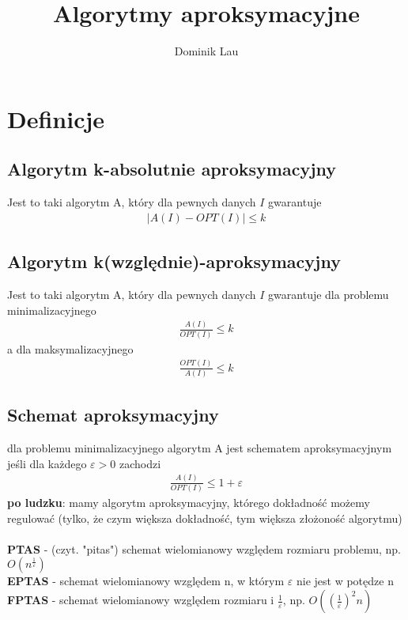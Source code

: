 \documentclass{article}
\title{Algorytmy aproksymacyjne}
\author{Dominik Lau}
\begin{document}
\maketitle

\section{Definicje}
\subsection{Algorytm k-absolutnie aproksymacyjny}
Jest to taki algorytm A, który dla pewnych danych $I$ gwarantuje
\begin{gather*}
	|A(I) - OPT(I)| \leq k
\end{gather*}
\subsection{Algorytm k(względnie)-aproksymacyjny}
Jest to taki algorytm A, który dla pewnych danych $I$ gwarantuje dla problemu minimalizacyjnego
\begin{gather*}
	\frac{A(I)}{OPT(I)} \leq k
\end{gather*}
a dla maksymalizacyjnego
\begin{gather*}
	\frac{OPT(I)}{A(I)} \leq k
\end{gather*}

\subsection{Schemat aproksymacyjny}
dla problemu minimalizacyjnego algorytm A jest schematem aproksymacyjnym
jeśli dla każdego $\varepsilon > 0$ zachodzi
\begin{gather*}
	\frac{A(I)}{OPT(I)} \leq 1 + \varepsilon
\end{gather*}
\textbf{po ludzku}: mamy algorytm aproksymacyjny,  którego dokładność możemy regulować (tylko, że czym większa dokładność, tym większa złożoność algorytmu)\\\\
\textbf{PTAS} - (czyt. "pitas") schemat wielomianowy względem rozmiaru problemu,  np.  $O(n^{\frac{1}{\varepsilon}})$ \\
\textbf{EPTAS} - schemat wielomianowy względem n, w którym $\varepsilon$ nie jest w potędze n \\
\textbf{FPTAS} - schemat wielomianowy względem rozmiaru  i $\frac{1}{\varepsilon}$, np. $O((\frac{1}{\varepsilon})^2n)$
\end{document}
